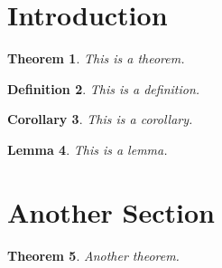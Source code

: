 \documentclass{article}
\newtheorem{theorem}{Theorem}[section]
\newtheorem{definition}[theorem]{Definition}
\newtheorem{corollary}[theorem]{Corollary}
\newtheorem{lemma}[theorem]{Lemma}
\begin{document}
	
	\section{Introduction}
	
	\begin{theorem}
		This is a theorem.
	\end{theorem}
	
	\begin{definition}
		This is a definition.
	\end{definition}
	
	\begin{corollary}
		This is a corollary.
	\end{corollary}
	
	\begin{lemma}
		This is a lemma.
	\end{lemma}
	
	\section{Another Section}
	
	\begin{theorem}
		Another theorem.
	\end{theorem}
	
\end{document}
